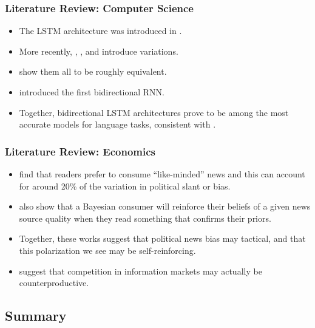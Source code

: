 \documentclass{beamer}
\begin{document}
	\begin{frame}
		\frametitle{Literature Review: Computer Science}
		\begin{itemize}
			\item The LSTM architecture was introduced in \citet{hochreiter1997long}. 
			\item More recently, \citet{gers2000recurrent}, \citet{chung2014empirical}, and \citet{yao2015depth} introduce variations. 
			\item \citet{greff2016lstm} show them all to be roughly equivalent. 
			\item \citet{schuster1997bidirectional} introduced the first bidirectional RNN. 
			\item Together, bidirectional LSTM architectures prove to be among the most accurate models for language tasks, consistent with \citet{wang2015unified}. 
		\end{itemize}
	\end{frame}
	
	\begin{frame}
		\frametitle{Literature Review: Economics}
		\begin{itemize}
			\item \citet{gentzkow2010drives} find that readers prefer to consume ``like-minded'' news and this can account for around 20\% of the variation in political slant or bias.
			\item \citet{gentzkow2006media} also show that a Bayesian consumer will reinforce their beliefs of a given news source quality when they read something that confirms their priors.
			\item Together, these works suggest that political news bias may tactical, and that this polarization we see may be self-reinforcing.
			\item \citet{gentzkow2008competition} suggest that competition in information markets may actually be counterproductive. 
		\end{itemize}
	\end{frame}

    \subsection{Summary}
    
\end{document}
